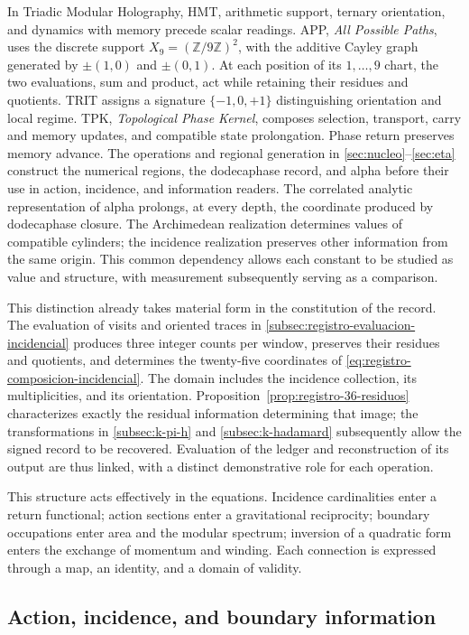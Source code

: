 In Triadic Modular Holography, HMT, arithmetic support, ternary
orientation, and dynamics with memory precede scalar readings.
APP, \emph{All Possible Paths}, uses the discrete support
\(X_9=(\mathbb Z/9\mathbb Z)^2\), with the additive Cayley graph
generated by \(\pm(1,0)\) and \(\pm(0,1)\). At each position
of its \(1,\ldots,9\) chart, the two evaluations, sum and
product, act while retaining their residues and quotients. TRIT assigns
a signature \(\{-1,0,+1\}\) distinguishing orientation and local regime.
TPK, \emph{Topological Phase Kernel}, composes selection, transport,
carry and memory updates, and compatible state prolongation.
Phase return preserves memory advance. The operations and regional
generation in \ref{sec:nucleo}--\ref{sec:eta} construct the numerical
regions, the dodecaphase record, and alpha before their use in
action, incidence, and information readers.
The correlated analytic representation of alpha prolongs, at every
depth, the coordinate produced by dodecaphase closure.
The Archimedean realization determines values of compatible cylinders;
the incidence realization preserves other information from the same origin.
This common dependency allows each constant to be studied as value and
structure, with measurement subsequently serving as a comparison.

This distinction already takes material form in the constitution of the record.
The evaluation of visits and oriented traces in
\ref{subsec:registro-evaluacion-incidencial} produces three integer counts
per window, preserves their residues and quotients, and determines the twenty-five
coordinates of \eqref{eq:registro-composicion-incidencial}. The domain
includes the incidence collection, its multiplicities, and its orientation.
Proposition~\ref{prop:registro-36-residuos} characterizes exactly the
residual information determining that image; the transformations
in \ref{subsec:k-pi-h} and \ref{subsec:k-hadamard} subsequently allow the
signed record to be recovered. Evaluation of the ledger and
reconstruction of its output are thus linked, with a distinct demonstrative role
for each operation.

This structure acts effectively in the equations.
Incidence cardinalities enter a
return functional; action sections enter a
gravitational reciprocity; boundary occupations enter area
and the modular spectrum; inversion of a quadratic form enters
the exchange of momentum and winding. Each connection is expressed
through a map, an identity, and a domain of validity.

\subsection{Action, incidence, and boundary information}

